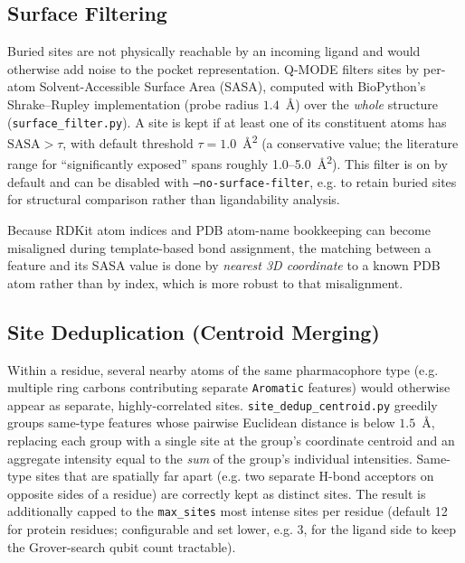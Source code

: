 \documentclass[11pt,a4paper]{article}
\begin{document}
\subsection{Surface Filtering}
\label{sec:surface-filter}

Buried sites are not physically reachable by an incoming ligand and would otherwise add noise to the pocket representation. Q-MODE filters sites by per-atom Solvent-Accessible Surface Area (SASA), computed with BioPython's Shrake--Rupley implementation (probe radius $1.4$~\r{A}) over the \emph{whole} structure (\texttt{surface\_filter.py}). A site is kept if at least one of its constituent atoms has $\text{SASA} > \tau$, with default threshold $\tau = 1.0$~\r{A}\textsuperscript{2} (a conservative value; the literature range for ``significantly exposed'' spans roughly 1.0--5.0~\r{A}\textsuperscript{2}). This filter is on by default and can be disabled with \texttt{--no-surface-filter}, e.g. to retain buried sites for structural comparison rather than ligandability analysis.

Because RDKit atom indices and PDB atom-name bookkeeping can become misaligned during template-based bond assignment, the matching between a feature and its SASA value is done by \emph{nearest 3D coordinate} to a known PDB atom rather than by index, which is more robust to that misalignment.

\subsection{Site Deduplication (Centroid Merging)}
\label{sec:dedup}

Within a residue, several nearby atoms of the same pharmacophore type (e.g. multiple ring carbons contributing separate \texttt{Aromatic} features) would otherwise appear as separate, highly-correlated sites. \texttt{site\_dedup\_centroid.py} greedily groups same-type features whose pairwise Euclidean distance is below $1.5$~\r{A}, replacing each group with a single site at the group's coordinate centroid and an aggregate intensity equal to the \emph{sum} of the group's individual intensities. Same-type sites that are spatially far apart (e.g. two separate H-bond acceptors on opposite sides of a residue) are correctly kept as distinct sites. The result is additionally capped to the \texttt{max\_sites} most intense sites per residue (default 12 for protein residues; configurable and set lower, e.g. 3, for the ligand side to keep the Grover-search qubit count tractable).
\end{document}
